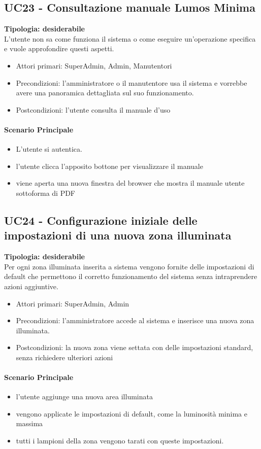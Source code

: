 \documentclass[12pt]{article}
\begin{document}
\subsection{UC23 - Consultazione manuale Lumos Minima}
\textbf{Tipologia: desiderabile}\\
L'utente non sa come funziona il sistema o come eseguire un'operazione specifica e vuole approfondire questi aspetti.
\begin{itemize}
	\item Attori primari: SuperAdmin, Admin, Manutentori
	\item Precondizioni: l'amministratore o il manutentore usa il sistema e vorrebbe avere una panoramica dettagliata sul suo funzionamento.
	\item Postcondizioni: l'utente consulta il manuale d'uso
\end{itemize}
\paragraph{Scenario Principale}
\begin{itemize}
	\item L'utente si autentica.
	\item l'utente clicca l'apposito bottone per visualizzare il manuale
	\item viene aperta una nuova finestra del browser che mostra il manuale utente sottoforma di PDF
\end{itemize}


\subsection{UC24 - Configurazione iniziale delle impostazioni di una nuova zona illuminata}
\textbf{Tipologia: desiderabile} \\
Per ogni zona illuminata inserita a sistema vengono fornite delle impostazioni di default che permettono il corretto funzionamento del sistema senza intraprendere azioni aggiuntive.
\begin{itemize}
	\item Attori primari: SuperAdmin, Admin
	\item Precondizioni: l'amministratore accede al sistema e inserisce una nuova zona illuminata.
	\item Postcondizioni: la nuova zona viene settata con delle impostazioni standard, senza richiedere ulteriori azioni
\end{itemize}
\paragraph{Scenario Principale}
\begin{itemize}
	\item l'utente aggiunge una nuova area illuminata
	\item vengono applicate le impostazioni di default, come la luminosità minima e massima
	\item tutti i lampioni della zona vengono tarati con queste impostazioni.
\end{itemize}
\end{document}

